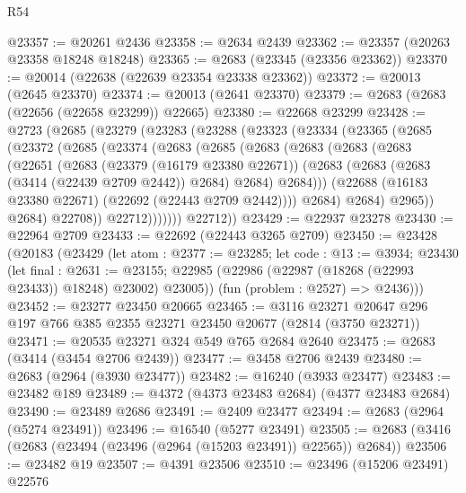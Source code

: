 \begin{lexlean}{R54}
\begin{coremodule}
@23357 := @20261 @2436
@23358 := @2634 @2439
@23362 := @23357 (@20263 @23358 @18248 @18248)
@23365 := @2683 (@23345 (@23356 @23362))
@23370 := @20014 (@22638 (@22639 @23354 @23338 @23362))
@23372 := @20013 (@2645 @23370)
@23374 := @20013 (@2641 @23370)
@23379 := @2683 (@2683 (@22656 (@22658 @23299)) @22665)
@23380 := @22668 @23299
@23428 := @2723
    (@2685
      (@23279
        (@23283
          (@23288
            (@23323
              (@23334
                (@23365
                  (@2685
                    (@23372
                      (@2685
                        (@23374
                          (@2683
                            (@2685
                              (@2683
                                (@2683
                                  (@2683
                                    (@2683
                                      (@22651
                                        (@2683
                                          (@23379 (@16179 @23380 @22671))
                                          (@2683
                                            (@2683 (@2683 (@3414 (@22439 @2709 @2442)) @2684) @2684)
                                            @2684)))
                                      (@22688 (@16183 @23380 @22671) (@22692 (@22443 @2709 @2442))))
                                    @2684)
                                  @2684)
                                @2965))
                            @2684)
                          @22708))
                      @22712)))))))
        @22712))
@23429 := @22937 @23278
@23430 := @22964 @2709
@23433 := @22692 (@22443 @3265 @2709)
@23450 := @23428
    (@20183
      (@23429
        (let atom : @2377 := @23285;
        let code : @13 := @3934;
        @23430
          (let final : @2631 := @23155;
          @22985 (@22986 (@22987 (@18268 (@22993 @23433)) @18248) @23002) @23005))
        (fun (problem : @2527) => @2436)))
@23452 := @23277 @23450 @20665
@23465 := @3116 @23271 @20647 @296 @197 @766 @385 @2355 @23271 @23450 @20677 (@2814 (@3750 @23271))
@23471 := @20535 @23271 @324 @549 @765 @2684 @2640
@23475 := @2683 (@3414 (@3454 @2706 @2439))
@23477 := @3458 @2706 @2439
@23480 := @2683 (@2964 (@3930 @23477))
@23482 := @16240 (@3933 @23477)
@23483 := @23482 @189
@23489 := @4372 (@4373 @23483 @2684) (@4377 @23483 @2684)
@23490 := @23489 @2686
@23491 := @2409 @23477
@23494 := @2683 (@2964 (@5274 @23491))
@23496 := @16540 (@5277 @23491)
@23505 := @2683 (@3416 (@2683 (@23494 (@23496 (@2964 (@15203 @23491)) @22565)) @2684))
@23506 := @23482 @19
@23507 := @4391 @23506
@23510 := @23496 (@15206 @23491) @22576

\end{coremodule}
\end{lexlean}

